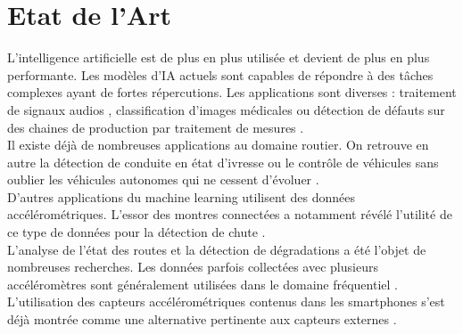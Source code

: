 \section{Etat de l'Art}
L'intelligence artificielle est de plus en plus utilisée et devient de plus en plus performante. Les modèles d'IA actuels sont capables de répondre à des tâches complexes ayant de fortes répercutions. Les applications sont diverses : traitement de signaux audios \cite{rtx_voice}, classification d'images médicales \cite{inria_medical} ou détection de défauts sur des chaines de production par traitement de mesures \cite{valeo}.\\

Il existe déjà de nombreuses applications au domaine routier. On retrouve en autre la détection de conduite en état d'ivresse \cite{drunk_1}\cite{drunk_2} ou le contrôle de véhicules \cite{xxii} sans oublier les véhicules autonomes qui ne cessent d'évoluer \cite{nvidia_car}.\\

D'autres applications du machine learning utilisent des données accélérométriques. L'essor des montres connectées a notamment révélé l'utilité de ce type de données pour la détection de chute \cite{fall_1} \cite{fall_2}.\\

L'analyse de l'état des routes et la détection de dégradations a été l'objet de nombreuses recherches. Les données parfois collectées avec plusieurs accéléromètres \cite{road_1} sont généralement utilisées dans le domaine fréquentiel \cite{road_2}\cite{road_3}. L'utilisation des capteurs accélérométriques contenus dans les smartphones s'est déjà montrée comme une alternative pertinente aux capteurs externes \cite{road_4}.\\